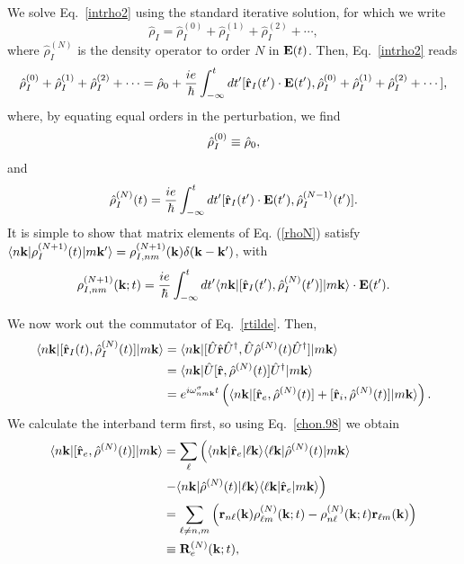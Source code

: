 \documentclass[floatfix,prb,aps,superscriptaddress,11pt,preprint,letterpaper]{revtex4}
\begin{document}
We solve Eq.~\eqref{intrho2} using the standard iterative
solution, for which we write
\begin{equation}\label{rhop}
\hat\rho_I=\hat\rho_I^{(0)}+\hat\rho_I^{(1)}+\hat\rho_I^{(2)}+\cdots
,
\end{equation}
where $\hat\rho_I^{(N)}$ is the density operator to order $N$ in $\mathbf{E}(t)$.
Then, Eq.~\eqref{intrho2} reads
\begin{equation}\label{intrho3}
\hat\rho_I^{(0)}+\hat\rho_I^{(1)}+\hat\rho_I^{(2)}+\cdots
=\hat{{\rho}}_0
+
\frac{ie}{\hbar}\int_{-\infty}^t dt'[\hat{\mathbf{r}}_I(t')\cdot\mathbf{E}(t'),
\hat\rho_I^{(0)}+\hat\rho_I^{(1)}+\hat\rho_I^{(2)}+\cdots
]
,
\end{equation}
where, by equating equal orders in the perturbation, we find
\begin{equation}\label{rho0}
\hat{{\rho}}_I^{(0)}\equiv\hat{{\rho}}_0
,
\end{equation}
and
\begin{equation}\label{rhoN}
\hat{{\rho}}_I^{(N)}(t)=
\frac{ie}{\hbar}
\int_{-\infty}^t dt'[\hat{\mathbf{r}}_I(t')\cdot\mathbf{E}(t'),\hat{{\rho}}^{(N-1)}_I(t')].
\end{equation}
It is simple to show that matrix elements of Eq. (\ref{rhoN}) satisfy
$\langle n\mathbf{k} |{\rho}_I^{(N+1)}(t)| m\mathbf{k}' \rangle={\rho}^{(N+1)}_{I,nm}(\mathbf{k})\delta(\mathbf{k}-\mathbf{k}')$,
with
\begin{equation}\label{rtilde}
{\rho}^{(N+1)}_{I,nm}(\mathbf{k};t)
=\frac{ie}{\hbar}\int_{-\infty}^t dt'
\langle n\mathbf{k} |
[\hat{\mathbf{r}}_I(t'),\hat{{\rho}}^{(N)}_I(t')]
| m\mathbf{k} \rangle
\cdot\mathbf{E}(t')
.
\end{equation}

We now work out the commutator of Eq.~\eqref{rtilde}. Then,
\begin{align}\label{conmu1}
\langle n\mathbf{k} |
[\hat{\mathbf{r}}_I(t),\hat{{\rho}}^{(N)}_I(t)]
| m\mathbf{k} \rangle
&=
\langle n\mathbf{k} |
[\hat{U}\hat{\mathbf{r}}\hat{U}^\dagger,\hat{U}\hat{{\rho}}^{(N)}(t)\hat{U}^\dagger]
| m\mathbf{k} \rangle
\nonumber \\
&=
\langle n\mathbf{k} |
\hat{U}[\hat{\mathbf{r}},\hat{{\rho}}^{(N)}(t)]\hat{U}^\dagger
| m\mathbf{k} \rangle
\\
&=
e^{i\omega^\sigma_{nm\mathbf{k}}t}
\left(
\langle n\mathbf{k} |
[\hat{\mathbf{r}}_e,\hat{{\rho}}^{(N)}(t)]
+
[\hat{\mathbf{r}}_i,\hat{{\rho}}^{(N)}(t)]
| m\mathbf{k} \rangle
\right)
\nonumber
.
\end{align}
We calculate the interband term first, so using Eq.~\eqref{chon.98} we obtain
\begin{align}\label{conmu2}
\langle n\mathbf{k} |
[\hat{\mathbf{r}}_e,\hat{{\rho}}^{(N)}(t)]
| m\mathbf{k} \rangle
&=
\sum_{\ell}
\left(
\langle n\mathbf{k} |
\hat{\mathbf{r}}_e
| \ell\mathbf{k} \rangle
\langle \ell\mathbf{k} |
\hat{{\rho}}^{(N)}(t)
| m\mathbf{k} \rangle
\right.
\nonumber \\
&
\left.
-
\langle n\mathbf{k} |
\hat{{\rho}}^{(N)}(t)
| \ell\mathbf{k} \rangle
\langle \ell\mathbf{k} |
\hat{\mathbf{r}}_e
| m\mathbf{k} \rangle
\right)
\nonumber \\
&=
\sum_{\ell\ne n,m}
\left(
\mathbf{r}_{n\ell}(\mathbf{k})
{\rho}^{(N)}_{\ell m}(\mathbf{k};t)
-
{\rho}^{(N)}_{n\ell}(\mathbf{k};t)
\mathbf{r}_{\ell m}(\mathbf{k})
\right)
\nonumber\\
&\equiv
\mathbf{R}^{(N)}_e(\mathbf{k};t)
,
\end{align}
\end{document}
